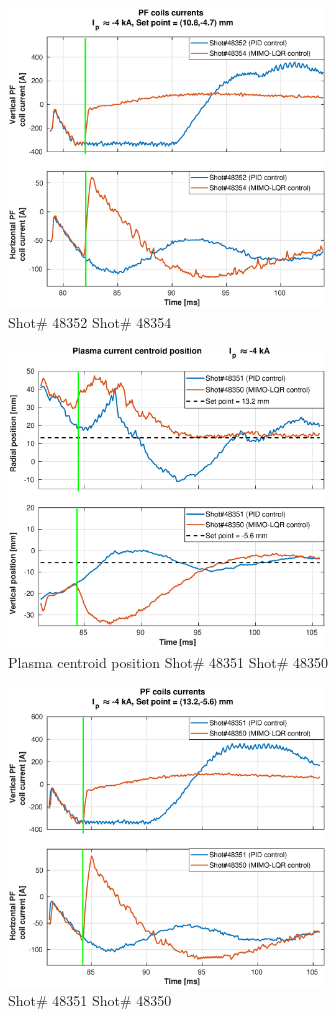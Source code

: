 \begin{figure}
	\centering
	\includegraphics[width=0.75\textwidth]{Chp5/PIDvsMIMO_352_354_curr_2.eps}
	\caption{ Shot\# 48352 Shot\# 48354}
\end{figure}


\begin{figure}
	\centering
	\includegraphics[width=0.75\textwidth]{Chp5/PIDvsMIMO_351_350_2.eps}
	\caption{Plasma centroid position Shot\# 48351 Shot\# 48350}
\end{figure}

\begin{figure}
	\centering
	\includegraphics[width=0.75\textwidth]{Chp5/PIDvsMIMO_351_350_curr_2.eps}
	\caption{ Shot\# 48351 Shot\# 48350}
\end{figure}